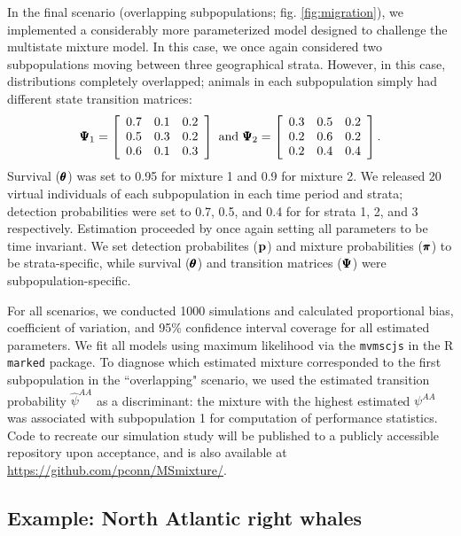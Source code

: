 \documentclass[times,mee,doublespace,]{besauth2}
\begin{document}
In the final scenario (overlapping subpopulations; fig. \ref{fig:migration}), we implemented a considerably more parameterized model designed to challenge the multistate mixture model.  In this case, we once again considered two subpopulations moving between three geographical strata.  However, in this case, distributions completely overlapped; animals in each subpopulation simply had different state transition matrices:
\begin{eqnarray*}
  \pmb{\Psi}_1 = \left[ \begin{array}{ccc} 0.7 & 0.1 & 0.2 \\ 0.5 & 0.3 & 0.2 \\ 0.6 & 0.1 & 0.3 \end{array} \right]
  \text{  and  } \pmb{\Psi}_2 = \left[ \begin{array}{ccc} 0.3 & 0.5 & 0.2 \\ 0.2 & 0.6 & 0.2 \\ 0.2 & 0.4 & 0.4 \end{array} \right].
\end{eqnarray*}
Survival ($\pmb{\theta}$) was set to 0.95 for mixture 1 and 0.9 for mixture 2.  We released 20 virtual individuals of each subpopulation in each time period and strata; detection probabilities were set to 0.7, 0.5, and 0.4 for for strata 1, 2, and 3 respectively.  Estimation proceeded by once again setting all parameters to be time invariant.  We set detection probabilites (${\bf p}$) and mixture probabilities ($\pmb{\pi}$) to be strata-specific, while survival ($\pmb{\theta}$) and transition matrices ($\pmb{\Psi}$) were subpopulation-specific.

For all scenarios, we conducted 1000 simulations and calculated proportional bias, coefficient of variation, and 95\% confidence interval coverage for all estimated parameters.  We fit all models using maximum likelihood via the \texttt{mvmscjs} \citep{JohnsonEtAl2016} in the R \texttt{marked} \citep{LaakeEtAl2013} package.  To diagnose which estimated mixture corresponded to the first subpopulation in the ``overlapping" scenario, we used the estimated transition probability $\hat{\psi}^{AA}$ as a discriminant: the mixture with the highest estimated $\psi^{AA}$ was associated with subpopulation 1 for computation of performance statistics.  Code to recreate our simulation study will be published to a publicly accessible repository upon acceptance, and is also available at \url{https://github.com/pconn/MSmixture/}.

\subsection{Example: North Atlantic right whales}
\end{document}
